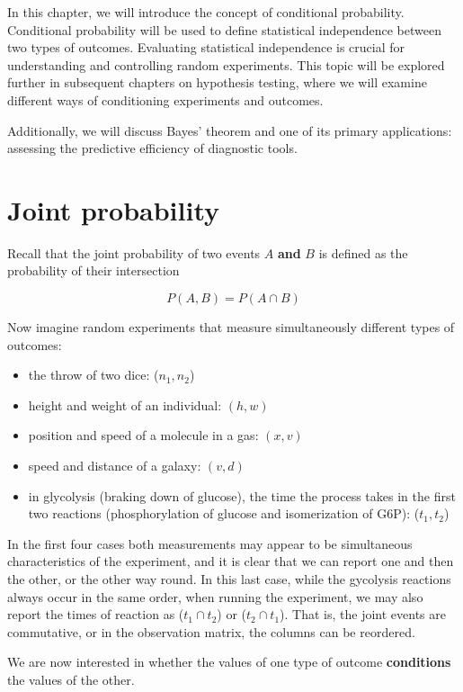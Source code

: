 \documentclass[
]{book}
\begin{document}
In this chapter, we will introduce the concept of conditional probability. Conditional probability will be used to define statistical independence between two types of outcomes. Evaluating statistical independence is crucial for understanding and controlling random experiments. This topic will be explored further in subsequent chapters on hypothesis testing, where we will examine different ways of conditioning experiments and outcomes.

Additionally, we will discuss Bayes' theorem and one of its primary applications: assessing the predictive efficiency of diagnostic tools.

\hypertarget{joint-probability}{%
\section{Joint probability}\label{joint-probability}}

Recall that the joint probability of two events \(A\) \textbf{and} \(B\) is defined as the probability of their intersection

\[P( A ,B )=P(A \cap B)\]

Now imagine random experiments that measure simultaneously different types of outcomes:

\begin{itemize}
\item
  the throw of two dice: (\(n_1, n_2\))
\item
  height and weight of an individual: \((h, w)\)
\item
  position and speed of a molecule in a gas: \((x, v)\)
\item
  speed and distance of a galaxy: \((v, d)\)
\item
  in glycolysis (braking down of glucose), the time the process takes in the first two reactions (phosphorylation of glucose and isomerization of G6P): (\(t_1, t_2\))
\end{itemize}

In the first four cases both measurements may appear to be simultaneous characteristics of the experiment, and it is clear that we can report one and then the other, or the other way round. In this last case, while the gycolysis reactions always occur in the same order, when running the experiment, we may also report the times of reaction as (\(t_1 \cap t_2\)) or (\(t_ 2 \cap t_1\)). That is, the joint events are commutative, or in the observation matrix, the columns can be reordered.

We are now interested in whether the values of one type of outcome \textbf{conditions} the values of the other.
\end{document}
